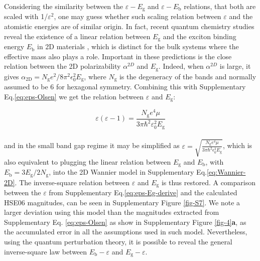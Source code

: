 \documentclass[journal=ancac3,manuscript=article,email=true,hyperref=true,keywords=true]{achemso}
\begin{document}
Considering the similarity between the \(\varepsilon-E_{\mathrm{g}}\) and
\(\varepsilon-E_{\mathrm{b}}\) relations, that both are scaled with
1/\(\varepsilon^{2}\), one may guess whether such scaling relation between \(\varepsilon\)
and the atomistic energies are of similar origin. In fact, recent
quantum chemistry studies reveal the existence of a linear
relation between \(E_{\mathrm{g}}\) and the exciton binding energy
\(E_{\mathrm{b}}\) in 2D materials
\cite{Choi_linear_2015,Jiang_2017_Eg_Eb}, which is distinct for the 
bulk systems where the effective mass also plays a role. Important in these predictions 
is the close relation between the 2D polarizability \(\alpha\)$^{2D}$ and 
\(E_{\mathrm{g}}\). Indeed, when \(\alpha\)$^{2D}$ is large, it gives 
$\alpha_{\mathrm{2D}} = N_{\mathrm{g}} e^{2} / 8 \pi^2 \epsilon_{0}^2 E_{\mathrm{g}}$, where
\(N_{\mathrm{g}}\) is the degeneracy of the bands and normally assumed
to be 6 for hexagonal symmetry\cite{Jiang_2017_Eg_Eb}. 
Combining this with Supplementary Eq.\ref{eq:eps-Olsen} we get 
the relation between \(\varepsilon\) and \(E_{\mathrm{g}}\):

\begin{equation}
\label{eq:eps-Eg-derive}
\varepsilon(\varepsilon - 1) = \frac{N_{\mathrm{g}} e^4 \mu}{3 \pi \hbar^2 \varepsilon_{0}^{2} E_{\mathrm{g}}}
\end{equation}
\\
and in the small band gap regime it may be simplified as 
$\varepsilon = \sqrt{\frac{N_{\mathrm{g}} e^4 \mu}{3 \pi \hbar^2 \epsilon_{0}^{2} E_{\mathrm{g}}}}$, 
which is also
equivalent to plugging the linear relation between \(E_{\mathrm{g}}\)
and \(E_{\mathrm{b}}\), with \(E_{\mathrm{b}} = 3 E_{\mathrm{g}} / 2
N_{\mathrm{g}}\), into the 2D Wannier model in Supplementary Eq.\ref{eq:Wannier-2D}. 
The inverse-square relation between \(\varepsilon\)
and \(E_{\mathrm{g}}\) is thus restored. A comparison between the
\(\varepsilon\) from Supplementary Eq.\ref{eq:eps-Eg-derive} and the calculated HSE06 magnitudes, 
can be seen in Supplementary Figure \ref{fig-S7}. 
We note a larger deviation using this model than the
magnitudes extracted from Supplementary Eq. \ref{eq:eps-Olsen} as 
show in Supplementary Figure \ref{fig-4}{\bf a}, 
as the accumulated error in all the
assumptions used in such model. Nevertheless, using the quantum
perturbation theory, it is possible to reveal the general
inverse-square law between \(E_{\mathrm{b}}-\varepsilon\) and
\(E_{\mathrm{g}} - \varepsilon\).
\end{document}
